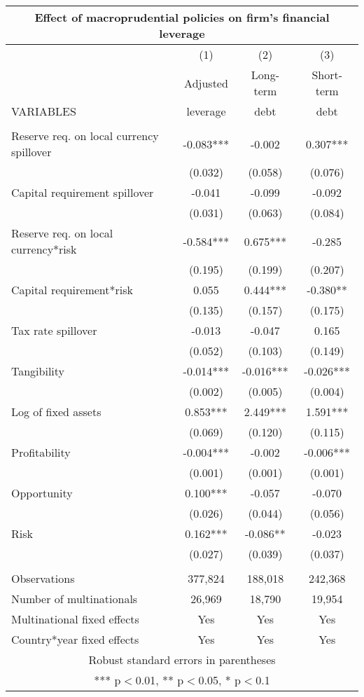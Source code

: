 \begin{tabular}{lccc}
\multicolumn{4}{c}{Effect of macroprudential policies on firm's financial leverage} \\ \hline
 & (1) & (2) & (3) \\
 & Adjusted & Long-term & Short-term \\
VARIABLES & leverage & debt & debt \\ \hline
 &  &  &  \\
Reserve req. on local currency spillover & -0.083*** & -0.002 & 0.307*** \\
 & (0.032) & (0.058) & (0.076) \\
Capital requirement spillover & -0.041 & -0.099 & -0.092 \\
 & (0.031) & (0.063) & (0.084) \\
Reserve req. on local currency*risk & -0.584*** & 0.675*** & -0.285 \\
 & (0.195) & (0.199) & (0.207) \\
Capital requirement*risk & 0.055 & 0.444*** & -0.380** \\
 & (0.135) & (0.157) & (0.175) \\
Tax rate spillover & -0.013 & -0.047 & 0.165 \\
 & (0.052) & (0.103) & (0.149) \\
Tangibility & -0.014*** & -0.016*** & -0.026*** \\
 & (0.002) & (0.005) & (0.004) \\
Log of fixed assets & 0.853*** & 2.449*** & 1.591*** \\
 & (0.069) & (0.120) & (0.115) \\
Profitability & -0.004*** & -0.002 & -0.006*** \\
 & (0.001) & (0.001) & (0.001) \\
Opportunity & 0.100*** & -0.057 & -0.070 \\
 & (0.026) & (0.044) & (0.056) \\
Risk & 0.162*** & -0.086** & -0.023 \\
 & (0.027) & (0.039) & (0.037) \\
 &  &  &  \\
Observations & 377,824 & 188,018 & 242,368 \\
Number of multinationals & 26,969 & 18,790 & 19,954 \\
Multinational fixed effects & Yes & Yes & Yes \\
 Country*year fixed effects & Yes & Yes & Yes \\ \hline
\multicolumn{4}{c}{ Robust standard errors in parentheses} \\
\multicolumn{4}{c}{ *** p$<$0.01, ** p$<$0.05, * p$<$0.1} \\
\end{tabular}
